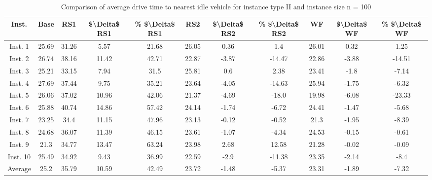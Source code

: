 \begin{table}[H]
\centering
\begin{tabular}{ccccccccccc}
  \hline
  \textbf{Inst.} & \textbf{Base} & \textbf{RS1} & \textbf{\$\textbackslash{}Delta\$  RS1} & \textbf{\% \$\textbackslash{}Delta\$  RS1} & \textbf{RS2} & \textbf{\$\textbackslash{}Delta\$  RS2} & \textbf{\% \$\textbackslash{}Delta\$  RS2} & \textbf{WF} & \textbf{\$\textbackslash{}Delta\$  WF} & \textbf{\% \$\textbackslash{}Delta\$  WF} \\\hline
  Inst. 1 & 25.69 & 31.26 & 5.57 & 21.68 & 26.05 & 0.36 & 1.4 & 26.01 & 0.32 & 1.25 \\
  Inst. 2 & 26.74 & 38.16 & 11.42 & 42.71 & 22.87 & -3.87 & -14.47 & 22.86 & -3.88 & -14.51 \\
  Inst. 3 & 25.21 & 33.15 & 7.94 & 31.5 & 25.81 & 0.6 & 2.38 & 23.41 & -1.8 & -7.14 \\
  Inst. 4 & 27.69 & 37.44 & 9.75 & 35.21 & 23.64 & -4.05 & -14.63 & 25.94 & -1.75 & -6.32 \\
  Inst. 5 & 26.06 & 37.02 & 10.96 & 42.06 & 21.37 & -4.69 & -18.0 & 19.98 & -6.08 & -23.33 \\
  Inst. 6 & 25.88 & 40.74 & 14.86 & 57.42 & 24.14 & -1.74 & -6.72 & 24.41 & -1.47 & -5.68 \\
  Inst. 7 & 23.25 & 34.4 & 11.15 & 47.96 & 23.13 & -0.12 & -0.52 & 21.3 & -1.95 & -8.39 \\
  Inst. 8 & 24.68 & 36.07 & 11.39 & 46.15 & 23.61 & -1.07 & -4.34 & 24.53 & -0.15 & -0.61 \\
  Inst. 9 & 21.3 & 34.77 & 13.47 & 63.24 & 23.98 & 2.68 & 12.58 & 21.28 & -0.02 & -0.09 \\
  Inst. 10 & 25.49 & 34.92 & 9.43 & 36.99 & 22.59 & -2.9 & -11.38 & 23.35 & -2.14 & -8.4 \\
  Average & 25.2 & 35.79 & 10.59 & 42.49 & 23.72 & -1.48 & -5.37 & 23.31 & -1.89 & -7.32 \\\hline
\end{tabular}
\caption{Comparison of average drive time to nearest idle vehicle for instance type II and instance size n = 100}
\label{tab:wait:resrelocation-nearest-drive-time-comparison_II_100}
\end{table}
